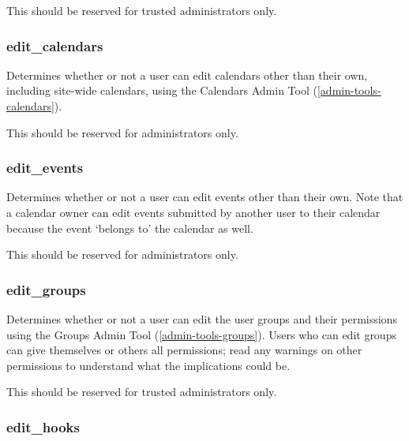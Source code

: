 This should be reserved for trusted administrators only.

\subsubsection{edit\_calendars}
\label{perm-edit-calendars}

Determines whether or not a user can edit calendars other than their own, including site-wide calendars, using the Calendars Admin Tool (\ref{admin-tools-calendars}).

This should be reserved for administrators only.



\subsubsection{edit\_events}
\label{perm-edit-events}

Determines whether or not a user can edit events other than their own. Note that a calendar owner can edit events submitted by another user to their calendar because the event `belongs to' the calendar as well.

This should be reserved for administrators only.

\subsubsection{edit\_groups}
\label{perm-edit-groups}

Determines whether or not a user can edit the user groups and their permissions using the Groups Admin Tool (\ref{admin-tools-groups}).  Users who can edit groups can give themselves or others all permissions; read any warnings on other permissions to understand what the implications could be.

This should be reserved for trusted administrators only.

\subsubsection{edit\_hooks}
\label{perm-edit-hooks}

